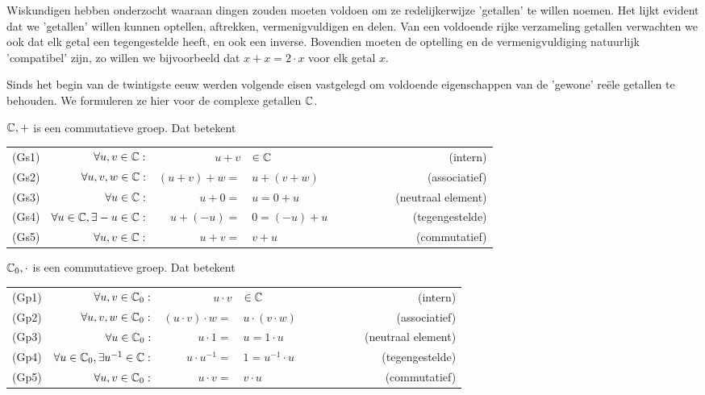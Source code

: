 \documentclass{ximera}
\begin{document}
	\author{Wim Obbels}
	\label{xim:cmplx_structuur}

    Wiskundigen hebben onderzocht waaraan dingen zouden moeten voldoen om ze redelijkerwijze 'getallen' te willen noemen. Het lijkt evident dat we 'getallen' willen kunnen optellen, aftrekken, vermenigvuldigen en delen. Van een voldoende rijke verzameling getallen verwachten we ook dat elk getal een tegengestelde heeft, en ook een inverse. Bovendien moeten de optelling en de vermenigvuldiging natuurlijk 'compatibel' zijn, zo willen we bijvoorbeeld dat $x+x = 2\cdot x$ voor elk getal $x$.

    Sinds het begin van de twintigste eeuw werden volgende eisen vastgelegd om voldoende eigenschappen van de 'gewone' reële getallen te behouden.
    We formuleren ze hier voor de complexe getallen $\mathbb{C}$.

    \begin{proposition} $\mathbb{C},+$ is een commutatieve groep. Dat betekent

        \begin{tabular}{lrr@{ }llr}
            (Gs1) & $\forall u,v\in\mathbb{C}:$ & $u+v$&$\in\mathbb{C}$ & $\qquad\qquad$& (intern) \\
            (Gs2) & $\forall u,v,w\in\mathbb{C}:$ & $(u+v)+w = $&$u+(v+w)$  & $\qquad\qquad$& (associatief) \\
            (Gs3) & $\forall u\in\mathbb{C}:$ & $u+ 0 = $&$u = 0+u $  & $\qquad\qquad$& (neutraal element) \\
            (Gs4) & $\forall u\in\mathbb{C},\exists -u\in\mathbb{C}:$ & $ u+ (-u) = $&$0 = (-u) +u $  & $\qquad\qquad$& (tegengestelde) \\
            (Gs5) & $\forall u,v \in\mathbb{C}:$ & $ u+ v = $&$v+ u $  & $\qquad\qquad$& (commutatief) 

        \end{tabular}
    \end{proposition}

    \begin{proposition} $\mathbb{C}_0,\cdot$ is een commutatieve groep. Dat betekent

        \begin{tabular}{lr@{\qquad }r@{ }llr}
            (Gp1) & $\forall u,v\in\mathbb{C}_0:$ & $u\cdot v$&$\in\mathbb{C}$ & $\qquad\qquad$& (intern) \\
            (Gp2) & $\forall u,v,w\in\mathbb{C}_0:$ & $(u\cdot v)\cdot w = $&$u\cdot(v\cdot w)$  & $\qquad\qquad$& (associatief) \\
            (Gp3) & $\forall u\in\mathbb{C}_0:$ & $u\cdot 1 = $&$u = 1\cdot u $  & $\qquad\qquad$& (neutraal element) \\
            (Gp4) & $\forall u\in\mathbb{C}_0,\exists u^{-1}\in\mathbb{C}:$ & $ u\cdot u^{-1} =$&$ 1 = u^{-1}\cdot u $  & $\qquad\qquad$& (tegengestelde) \\
            (Gp5) & $\forall u,v \in\mathbb{C}_0:$ & $ u \cdot v =$&$ v\cdot u $  & $\qquad\qquad$& (commutatief) 
        \end{tabular}
    \end{proposition}
\end{document}
